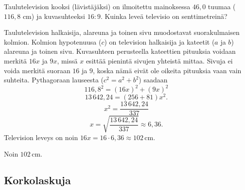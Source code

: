 \begin{esimerkki}
Taulutelevision kooksi (lävistäjäksi) on ilmoitettu mainoksessa $46,0$ tuumaa ($116,8$ cm) ja kuvasuhteeksi $16:9$. Kuinka leveä televisio on senttimetreinä?


\begin{esimratk}
Taulutelevision halkaisija, alareuna ja toinen sivu muodostavat suorakulmaisen kolmion. Kolmion hypotenuusa ($c$) on television halkaisija ja kateetit ($a$ ja $b$) alareuna ja toinen sivu. Kuvasuhteen perusteella kateettien pituuksia voidaan merkitä $16x$ ja $9x$, missä $x$ esittää pienintä sivujen yhteistä mittaa. Sivuja ei voida merkitä suoraan $16$ ja $9$, koska nämä eivät ole oikeita pituuksia vaan vain suhteita. Pythagoraan lauseesta ($c^2 = a^2 + b^2$) saadaan
\[
116,8^2 = (16x)^2 + (9x)^2
\]
\[
13\,642,24 = (256+81)x^2.
\]
\[
x^2 = \frac{13\,642,24}{337}
\]
\[
x= \sqrt{\frac{13\,642,24}{337}} \approx 6,36.
\]
Television leveys on noin $16x = 16\cdot 6,36\approx 102$\,cm.
\end{esimratk}

\begin{esimvast}Noin $102$\,cm. \end{esimvast}
\end{esimerkki}

\subsection{Korkolaskuja}

